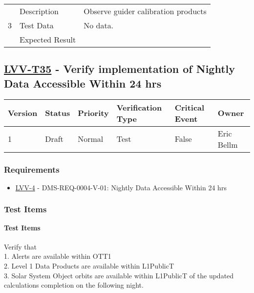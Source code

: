 \begin{longtable}[]{p{1.3cm}p{2cm}p{13cm}}
            \multirow{3}{*}{ 3 } & Description &
            \begin{minipage}[t]{13cm}{\footnotesize
            Observe guider calibration products

            \vspace{\dp0}
            } \end{minipage} \\ \cline{2-3}
            & Test Data &
            \begin{minipage}[t]{13cm}{\footnotesize
                No data.
                \vspace{\dp0}
            } \end{minipage} \\ \cline{2-3}
            & Expected Result &
        \\ \midrule
    \end{longtable}

\subsection{\href{https://jira.lsstcorp.org/secure/Tests.jspa\#/testCase/LVV-T35}{LVV-T35}
    - Verify implementation of Nightly Data Accessible Within 24 hrs}\label{lvv-t35}

\begin{longtable}[]{llllll}
\toprule
Version & Status & Priority & Verification Type & Critical Event & Owner
\\\midrule
1 & Draft & Normal &
Test & False & Eric Bellm
\\\bottomrule
\end{longtable}

\subsubsection{Requirements}
\begin{itemize}
\item \href{https://jira.lsstcorp.org/browse/LVV-4}{LVV-4} - DMS-REQ-0004-V-01: Nightly Data Accessible Within 24 hrs
\end{itemize}

\subsubsection{Test Items}
\textbf{Test Items}\\
~\\
Verify that\\
1. Alerts are available within OTT1\\
2. Level 1 Data Products are available within L1PublicT\\
3. Solar System Object orbits are available within L1PublicT of the
updated calculations completion on the following night.



